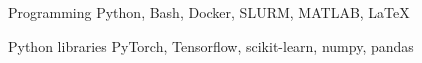 

\begin{cvskills}

  \cvskill
    {Programming} %
    {Python, Bash, Docker, SLURM, MATLAB, LaTeX} %

  \cvskill
    {Python libraries} %
    {PyTorch, Tensorflow, scikit-learn, numpy, pandas} %

\end{cvskills}

\clearpage
